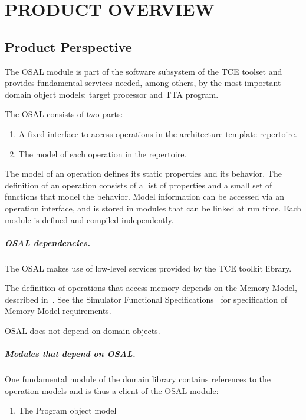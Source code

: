 \documentclass[twoside]{tce}
\begin{document}
\chapter{PRODUCT OVERVIEW}

\section{Product Perspective}

The OSAL module is part of the software subsystem of the TCE toolset and
provides fundamental services needed, among others, by the most important
domain object models: target processor and TTA program.

The OSAL consists of two parts:
\begin{enumerate}
\item %
  A fixed interface to access operations in the architecture template
  repertoire.
\item %
  The model of each operation in the repertoire.
\end{enumerate}
%
The model of an operation defines its static properties and its behavior.
The definition of an operation consists of a list of properties and a small
set of functions that model the behavior.  Model information can be
accessed via an operation interface, and is stored in modules that can be
linked at run time.  Each module is defined and compiled independently.

\paragraph{OSAL dependencies.}
The OSAL makes use of low-level services provided by the TCE toolkit
library.

The definition of operations that access memory depends on the Memory Model,
described in~\cite{MemoryModuleDesign}.  See the Simulator Functional
Specifications~\cite{SimulatorSpecs} for specification of Memory Model
requirements.

OSAL does not depend on domain objects.  

\paragraph{Modules that depend on OSAL.}
One fundamental module of the domain library contains references to the
operation models and is thus a client of the OSAL module:
\begin{enumerate}
\item %
  The Program object model
\end{enumerate}
\end{document}
